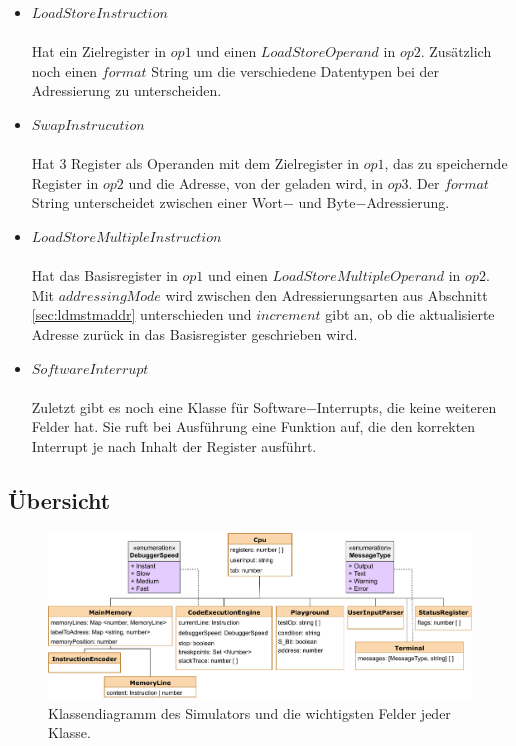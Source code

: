 \documentclass[a4paper, 11pt, onecolumn]{article}
\begin{document}
\begin{itemize}
\item $LoadStoreInstruction$\\ \\Hat ein Zielregister in $op1$ und einen $LoadStoreOperand$ in $op2$. Zusätzlich noch einen $format$ String um die verschiedene Datentypen bei der Adressierung zu unterscheiden.
\item $SwapInstrucution$\\ \\Hat 3 Register als Operanden mit dem Zielregister in $op1$, das zu speichernde Register in $op2$ und die Adresse, von der geladen wird, in $op3$. Der $format$ String unterscheidet zwischen einer Wort$-$ und Byte$-$Adressierung.
\item $LoadStoreMultipleInstruction$\\ \\Hat das Basisregister in $op1$ und einen $LoadStoreMultipleOperand$ in $op2$. Mit $addressingMode$ wird zwischen den Adressierungsarten aus Abschnitt \ref{sec:ldmstmaddr} unterschieden und $increment$ gibt an, ob die aktualisierte Adresse zurück in das Basisregister geschrieben wird.
\item $SoftwareInterrupt$\\ \\Zuletzt gibt es noch eine Klasse für Software$-$Interrupts, die keine weiteren Felder hat. Sie ruft bei Ausführung eine Funktion auf, die den korrekten Interrupt je nach Inhalt der Register ausführt.
\end{itemize} 

\subsection{Übersicht}\label{sec:overview}

\begin{figure}[!htb]
\centering
\includegraphics[width=1\textwidth]{data/classdiagramm}
\caption{Klassendiagramm des Simulators und die wichtigsten Felder jeder Klasse.}
\label{fig:classdiagramm}
\end{figure}
\end{document}
